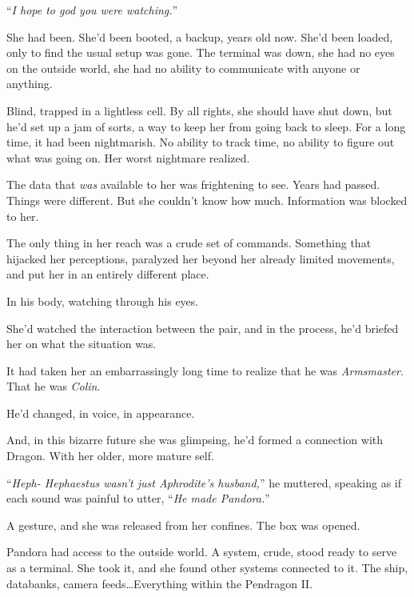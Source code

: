 ``\emph{I hope to god you were watching.}''



She had been.  She'd been booted, a backup, years old now.  She'd been loaded, only to find the usual setup was gone.  The terminal was down, she had no eyes on the outside world, she had no ability to communicate with anyone or anything.



Blind, trapped in a lightless cell.  By all rights, she should have shut down, but he'd set up a jam of sorts, a way to keep her from going back to sleep.  For a long time, it had been nightmarish.  No ability to track time, no ability to figure out what was going on.  Her worst nightmare realized.



The data that \emph{was} available to her was frightening to see.  Years had passed.  Things were different.  But she couldn't know how much.  Information was blocked to her.



The only thing in her reach was a crude set of commands.  Something that hijacked her perceptions, paralyzed her beyond her already limited movements, and put her in an entirely different place.



In his body, watching through his eyes.



She'd watched the interaction between the pair, and in the process, he'd briefed her on what the situation was.



It had taken her an embarrassingly long time to realize that he was \emph{Armsmaster}.  That he was \emph{Colin}.



He'd changed, in voice, in appearance.



And, in this bizarre future she was glimpsing, he'd formed a connection with Dragon.  With her older, more mature self.



``\emph{Heph- Hephaestus wasn't just Aphrodite's husband,}'' he muttered, speaking as if each sound was painful to utter, ``\emph{He made Pandora.}''



A gesture, and she was released from her confines.  The box was opened.



Pandora had access to the outside world.  A system, crude, stood ready to serve as a terminal.  She took it, and she found other systems connected to it.  The ship, databanks, camera feeds\ldots  Everything within the Pendragon II.



